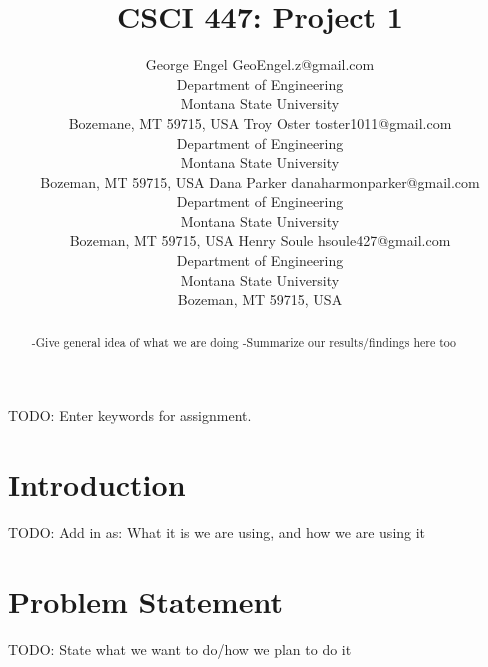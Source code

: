 \documentclass[twoside,11pt]{article}
\begin{document}
\title{CSCI 447: Project 1}

\author{\name George Engel \email GeoEngel.z@gmail.com \\
       \addr Department of Engineering\\
       Montana State University\\
       Bozemane, MT 59715, USA
       \AND
       \name Troy Oster \email toster1011@gmail.com \\
       \addr Department of Engineering\\
       Montana State University\\
       Bozeman, MT 59715, USA
       \AND
       \name Dana Parker \email danaharmonparker@gmail.com \\
       \addr Department of Engineering\\
       Montana State University\\
       Bozeman, MT 59715, USA
       \AND
       \name Henry Soule \email hsoule427@gmail.com \\
       \addr Department of Engineering\\
       Montana State University\\
       Bozeman, MT 59715, USA}


\maketitle

\begin{abstract}%

-Give general idea of what we are doing
-Summarize our results/findings here too

\end{abstract}

\begin{keywords}
    TODO: Enter keywords for assignment.
\end{keywords}

\section{Introduction}
TODO: Add in as: What it is we are using, and how we are using it

\section{Problem Statement}
TODO: State what we want to do/how we plan to do it
\end{document}
